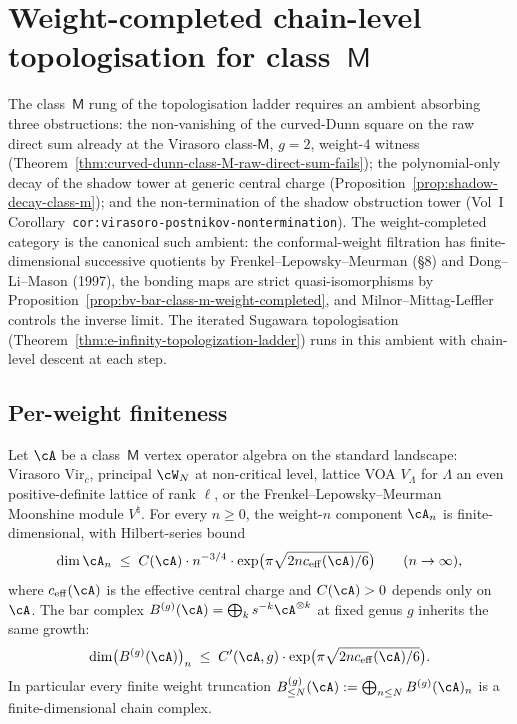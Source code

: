 \chapter{Weight-completed chain-level topologisation for class~$\mathsf{M}$}
\label{ch:weight-completed-topologization-class-m}

The class~$\mathsf{M}$ rung of the topologisation ladder requires an
ambient absorbing three obstructions: the non-vanishing of the
curved-Dunn square on the raw direct sum already at the Virasoro
class-$\mathsf M$, $g=2$, weight-$4$ witness
(Theorem~\ref{thm:curved-dunn-class-M-raw-direct-sum-fails}); the
polynomial-only decay of the shadow tower at generic central charge
(Proposition~\ref{prop:shadow-decay-class-m}); and the non-termination
of the shadow obstruction tower (Vol~I
Corollary~\texttt{cor:virasoro-postnikov-nontermination}). The
weight-completed category is the canonical such ambient: the
conformal-weight filtration has finite-dimensional successive
quotients by Frenkel--Lepowsky--Meurman (\S 8) and Dong--Li--Mason
(1997), the bonding maps are strict quasi-isomorphisms by
Proposition~\ref{prop:bv-bar-class-m-weight-completed}, and
Milnor--Mittag-Leffler controls the inverse limit. The iterated
Sugawara topologisation
(Theorem~\ref{thm:e-infinity-topologization-ladder}) runs in this
ambient with chain-level descent at each step.

\section{Per-weight finiteness}
\label{sec:per-weight-finiteness-class-m}

\begin{proposition}
\label{prop:per-weight-finite-rank-class-m}
\ClaimStatusProvedHere
Let $\cA$ be a class~$\mathsf{M}$ vertex operator algebra on the
standard landscape: Virasoro $\mathrm{Vir}_c$, principal $\cW_N$ at
non-critical level, lattice VOA $V_\Lambda$ for $\Lambda$ an even
positive-definite lattice of rank $\ell$, or the Frenkel--Lepowsky--Meurman
Moonshine module $V^{\natural}$. For every $n \ge 0$, the weight-$n$
component $\cA_n$ is finite-dimensional, with Hilbert-series bound
\[
 \dim \cA_n
 \;\le\;
 C(\cA) \cdot n^{-3/4} \cdot \exp\bigl(\pi \sqrt{2 n c_{\mathrm{eff}}(\cA)/6}\bigr)
 \qquad (n \to \infty),
\]
where $c_{\mathrm{eff}}(\cA)$ is the effective central charge and
$C(\cA) > 0$ depends only on $\cA$. The bar complex
$B^{(g)}(\cA) = \bigoplus_k s^{-k} \cA^{\otimes k}$ at fixed genus $g$
inherits the same growth:
\[
 \dim\bigl(B^{(g)}(\cA)\bigr)_n
 \;\le\;
 C'(\cA, g) \cdot \exp\bigl(\pi \sqrt{2 n c_{\mathrm{eff}}(\cA)/6}\bigr).
\]
In particular every finite weight truncation
$B^{(g)}_{\le N}(\cA) := \bigoplus_{n \le N} B^{(g)}(\cA)_n$ is a
finite-dimensional chain complex.
\end{proposition}

